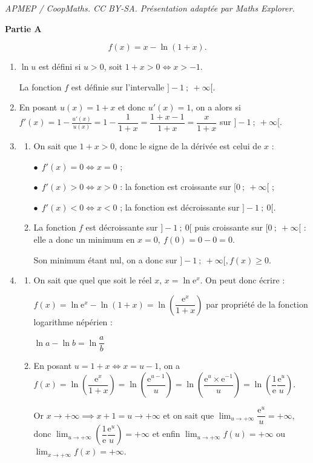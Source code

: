 \documentclass[10pt]{article}
\begin{document}
\noindent\textit{APMEP / CoopMaths. CC BY-SA. Présentation adaptée par Maths Explorer.}\par\medskip
\medskip

\textbf{Partie A}

\medskip


\[f(x) = x - \ln (1 + x).\]

\begin{enumerate}
\item 
$\ln u$ est défini si $u > 0$, soit $1 + x > 0 \iff x > - 1$.

La fonction $f$ est définie sur l'intervalle $]-1~;~+ \infty[$.
\item 


En posant $u(x) = 1 + x$ et donc $u'(x) = 1$, on a alors  si $f'(x) = 1 - \frac{u'(x)}{u(x)} = 1 - \dfrac{1}{1 + x} = \dfrac{1 + x - 1}{1 + x} = \dfrac{x}{1 + x}$ sur $]-1~;~+ \infty[$.
\item 
	\begin{enumerate}
		\item 
On sait que $1 + x > 0$, donc le signe de la dérivée est celui de $x$ :
		
$\bullet~~f'(x) = 0 \iff x = 0$ ;

$\bullet~~f'(x) > 0 \iff x > 0$  : la fonction est croissante sur $[0~;~+ \infty[$ ;

$\bullet~~f'(x) < 0 \iff x < 0$ ; la fonction est décroissante sur $]-1~;~0[$.
		\item 
La fonction $f$ est décroissante sur $]-1~;~0[$ puis croissante sur $[0~;~+ \infty[$ : elle a donc un minimum en $x = 0, \: f(0 ) = 0 - 0 = 0$. 

Son minimum étant nul, on a donc sur $]-1~;~+ \infty[, f(x) \geqslant 0$.
	\end{enumerate}
\item 
	\begin{enumerate}
		\item 
On sait que quel que soit le réel $x$, $x = \ln \text{e}^x$. On peut donc écrire :


$f(x) = \ln \text{e}^x - \ln (1 + x) = \ln \left(\dfrac{\text{e}^x}{1 + x}\right)$ par propriété de la fonction logarithme népérien :

 $\ln a - \ln b = \ln \dfrac ab$


		\item 
En posant $u = 1 + x \iff x = u - 1$, on a $f(x) = \ln \left(\dfrac{\text{e}^x}{1 + x}\right) = \ln \left(\dfrac{\text{e}^{u - 1}}{u}\right) = \ln \left(\dfrac{\text{e}^{u}\times \text{e}^{-1}}{u}\right) = \ln \left(\dfrac{1}{\text{e}}\dfrac{\text{e}^{u}}{u}\right)$.
		
Or $x \to + \infty \implies x + 1 = u \to + \infty$ et on sait que $\displaystyle\lim_{u \to + \infty} \dfrac{\text{e}^u}{u} = + \infty$, donc $\displaystyle\lim_{u \to + \infty} \left(\dfrac{1}{\text{e}}\dfrac{\text{e}^{u}}{u}\right) = + \infty$ et enfin $\displaystyle\lim_{u \to + \infty} f(u) = + \infty$ ou $\displaystyle\lim_{x \to + \infty} f(x) = + \infty$.
	\end{enumerate}
\end{enumerate}
\end{document}
